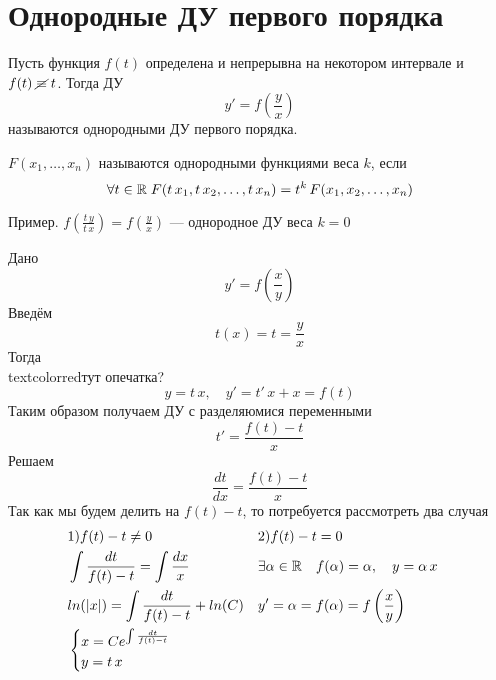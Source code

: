 \author{Tkachuk Andrei}

\section{Однородные ДУ первого порядка}

\begin{Def}
    Пусть функция $f(t)$ определена и непрерывна на некотором интервале и $f(t)\; \cancel{\equiv}\; t$. Тогда ДУ 
    \[
        y' = f\left(\frac{y}{x}\right)
    \]
    называются однородными ДУ первого порядка.
\end{Def}

\begin{Note}
    $F(x_1, \dots, x_n)$ называются однородными функциями веса $k$, если \[
        \forall t \in \mathbb{R} \; F(t\,x_1, t\,x_2, \dots, t\,x_n) = t^k\,F(x_1, x_2, \dots, x_n)
    \]
    
    Пример. $f(\frac{t\,y}{t\,x}) = f(\frac{y}{x})$ --- однородное ДУ веса $k = 0$
\end{Note}
\begin{Note} 
    Дано 
    \[
        y' = f\left(\frac{x}{y}\right)
    \]
    Введём 
    \[
        t(x) = t = \frac{y}{x}
    \]
    Тогда
    \\textcolor{red}{тут опечатка?}
    \[
        y = t\,x, \quad y' = t'\,x + x = f(t)
    \]
    Таким образом получаем ДУ с разделяюмися переменными
    \[
        t' = \frac{f(t) - t}{x}
    \]
    Решаем
    \[
        \frac{dt}{dx} = \frac{f(t) - t}{x}
    \]
    Так как мы будем делить на $f(t) - t$, то потребуется рассмотреть два случая
    \begin{align*}
        &1) f(t) - t \neq 0& &2) f(t) - t = 0&\\
        &\int\frac{dt}{f(t) - t} = \int \frac{dx}{x}& &\exists\alpha \in \mathbb{R} \quad f(\alpha) = \alpha, \quad y = \alpha\,x&\\
        &ln(|x|) = \int \frac{dt}{f(t) - t} + ln(C)& &y'=\alpha= f(\alpha) = f\left(\frac{x}{y}\right)&\\
        &\begin{cases}
            x = Ce^{\int \frac{dt}{f(t) - t}}\\
            y = t\,x
        \end{cases}&
    \end{align*}
\end{Note}

